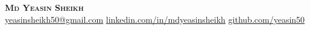 \begin{center}
    \textbf{\Huge \scshape Md Yeasin Sheikh} \\ \vspace{1pt}
    \href{mailto:yeasinsheikh50@gmail.com}{ \underline{yeasinsheikh50@gmail.com}} \quad
    \href{https://www.linkedin.com/in/mdyeasinsheikh}{ \underline{linkedin.com/in/mdyeasinsheikh}} \quad
    \href{https://github.com/yeasin50}{ \underline{github.com/yeasin50}}
\end{center}
